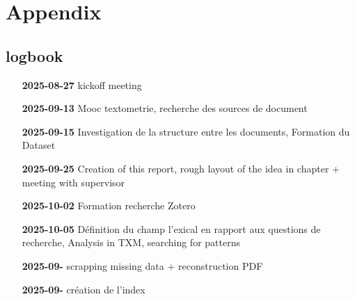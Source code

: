 \section{Appendix}

\subsection{logbook}

\begin{itemize}[leftmargin=1.5cm,label={}]
    \item[\textbf{2025-08-27}] kickoff meeting
    \item[\textbf{2025-09-13}] Mooc textometrie, recherche des sources de document
    \item[\textbf{2025-09-15}] Investigation de la structure entre les documents, Formation du Dataset
    \item[\textbf{2025-09-25}] Creation of this report, rough layout of the idea in chapter + meeting with supervisor
    \item[\textbf{2025-10-02}] Formation recherche Zotero
    \item[\textbf{2025-10-05}] Définition du champ l'exical en rapport aux questions de recherche, Analysis in TXM, searching for patterns
    
    \item[\textbf{2025-09-}] scrapping missing data + reconstruction PDF
    \item[\textbf{2025-09-}] création de l'index
\end{itemize}
